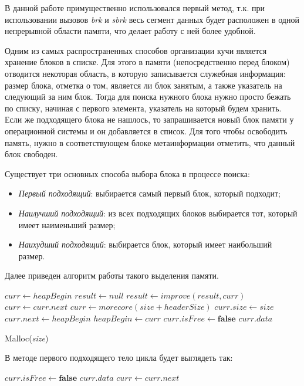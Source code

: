 \documentclass[12pt,a4paper]{article}
\begin{document}
В данной работе примущественно использовался первый метод, т.к. при использовании
вызовов \textit{brk} и \textit{sbrk} весь сегмент данных будет расположен 
в одной непрерывной области памяти, что делает работу с ней более удобной.  

Одним из самых распространенных способов организации кучи
является хранение блоков в списке. Для этого в памяти (непосредственно перед блоком)
отводится некоторая область, в которую записывается служебная информация:
размер блока, отметка о том, является ли блок занятым, а также указатель на 
следующий за ним блок. Тогда для поиска нужного блока нужно просто бежать по 
списку, начиная с первого элемента, указатель на который будем хранить. Если же 
подходящего блока не нашлось, то запрашивается новый блок памяти у операционной системы
и он добавляется в список. Для того чтобы освободить память, нужно в соответствующем
блоке метаинформации отметить, что данный блок свободен.

Существует три основных способа выбора блока в процессе поиска:
\begin{itemize}
\item
	\textit{Первый подходящий}: выбирается самый первый блок, который подходит;
\item
	\textit{Наилучший подходящий}: из всех подходящих блоков выбирается тот, который имеет наименьший размер; 
\item
	\textit {Наихудший подходящий}: выбирается блок, который имеет наибольший размер.
\end{itemize}  

Далее приведен алгоритм работы такого выделения памяти.

\begin{algorithm}[H]
\begin{algorithmic}[1]
\State $curr\gets heapBegin$
\State $result\gets null$
		\State $result\gets improve(result, curr)$				
	\EndIf
	\State $curr\gets curr.next$
\EndWhile
{}
	\State $curr\gets morecore(size + headerSize)$
	\State $curr.size\gets size$
	\State $curr.next\gets heapBegin$ 
	\State $heapBegin\gets curr$
\EndIf
\State $curr.isFree\gets \textbf{false}$
\State \Return $curr.data$
\end{algorithmic}
\caption{Malloc(\textit{size})}

В методе первого подходящего тело цикла будет выглядеть так:
\begin{algorithmic}[1]
	\State $curr.isFree\gets \textbf{false}$
	\State \Return $curr.data$
\EndIf
\State $curr\gets curr.next$
\end{algorithmic}

\end{algorithm}
\end{document}
